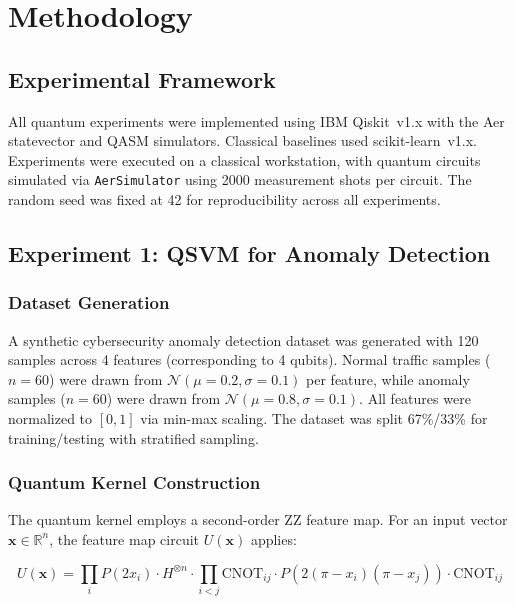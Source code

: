 \documentclass[conference]{IEEEtran}
\begin{document}
\section{Methodology}

\subsection{Experimental Framework}

All quantum experiments were implemented using IBM Qiskit~v1.x with the Aer statevector and QASM simulators. Classical baselines used scikit-learn~v1.x. Experiments were executed on a classical workstation, with quantum circuits simulated via \texttt{AerSimulator} using 2000 measurement shots per circuit. The random seed was fixed at 42 for reproducibility across all experiments.

\subsection{Experiment 1: QSVM for Anomaly Detection}

\subsubsection{Dataset Generation}
A synthetic cybersecurity anomaly detection dataset was generated with 120 samples across 4 features (corresponding to 4 qubits). Normal traffic samples ($n=60$) were drawn from $\mathcal{N}(\mu=0.2, \sigma=0.1)$ per feature, while anomaly samples ($n=60$) were drawn from $\mathcal{N}(\mu=0.8, \sigma=0.1)$. All features were normalized to $[0, 1]$ via min-max scaling. The dataset was split 67\%/33\% for training/testing with stratified sampling.

\subsubsection{Quantum Kernel Construction}
The quantum kernel employs a second-order ZZ feature map. For an input vector $\mathbf{x} \in \mathbb{R}^n$, the feature map circuit $U(\mathbf{x})$ applies:

\begin{equation}
U(\mathbf{x}) = \prod_{i} P(2x_i) \cdot H^{\otimes n} \cdot \prod_{i<j} \text{CNOT}_{ij} \cdot P(2(\pi - x_i)(\pi - x_j)) \cdot \text{CNOT}_{ij}
\end{equation}
\end{document}
